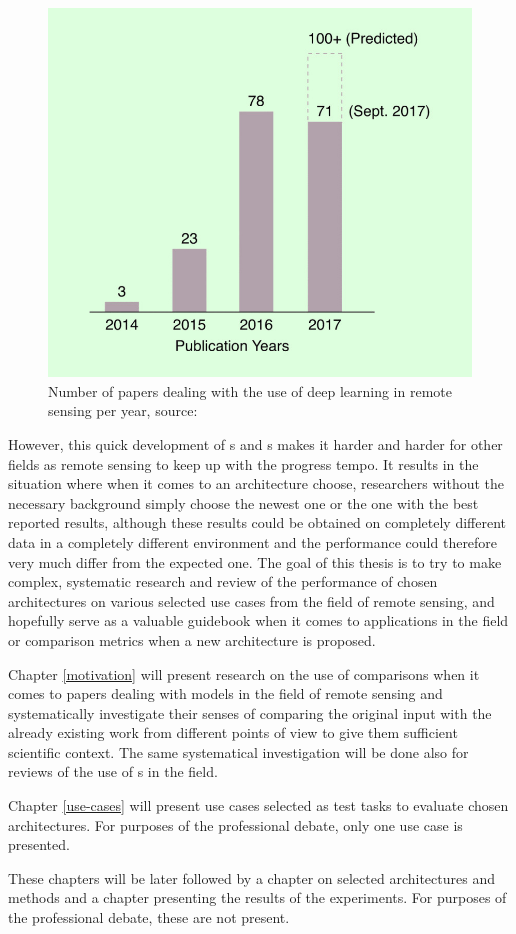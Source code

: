\begin{figure}[h]
   \centering
	\includegraphics[width=0.6\linewidth]{./pictures/dl-rs-papers.jpg}
	\caption[Papers on the use of DL in remote sensing]{Number of papers dealing with the use of deep learning in remote sensing per year, source: \cite{review-dl-rs-2017}}
      \label{fig-rs-dl}
\end{figure}

However, this quick development of s and s makes it harder and harder for other fields as remote sensing to keep up with the progress tempo. It results in the situation where when it comes to an  architecture choose, researchers without the necessary background simply choose the newest one or the one with the best reported results, although these results could be obtained on completely different data in a completely different environment and the performance could therefore very much differ from the expected one. The goal of this thesis is to try to make complex, systematic research and review of the performance of chosen  architectures on various selected use cases from the field of remote sensing, and hopefully serve as a valuable guidebook when it comes to  applications in the field or comparison metrics when a new architecture is proposed.

Chapter \ref{motivation} will present research on the use of comparisons when it comes to papers dealing with  models in the field of remote sensing and systematically investigate their senses of comparing the original input with the already existing work from different points of view to give them sufficient scientific context. The same systematical investigation will be done also for reviews of the use of s in the field.

Chapter \ref{use-cases} will present use cases selected as test tasks to evaluate chosen architectures. For purposes of the professional debate, only one use case is presented.

These chapters will be later followed by a chapter on selected architectures and methods and a chapter presenting the results of the experiments. For purposes of the professional debate, these are not present.